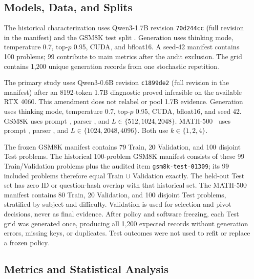 \documentclass[runningheads]{llncs}
\begin{document}
\subsection{Models, Data, and Splits}

The historical characterization uses Qwen3-1.7B revision
\texttt{70d244cc} (full revision in the manifest) and the GSM8K test split
\cite{cobbe2021gsm8k}. Generation uses thinking mode, temperature 0.7,
top-$p$ 0.95, CUDA, and bfloat16. A seed-42 manifest contains 100 problems; 99
contribute to main metrics after the audit exclusion. The grid contains 1,200
unique generation records from one stochastic repetition.

The primary study uses Qwen3-0.6B revision
\texttt{c1899de2} (full revision in the manifest) after an 8192-token 1.7B
diagnostic proved infeasible on the available RTX 4060. This amendment does
not relabel or pool 1.7B evidence. Generation uses thinking mode, temperature
0.7, top-$p$ 0.95, CUDA, bfloat16, and seed 42. GSM8K uses prompt
, parser , and
$L\in\{512,1024,2048\}$. MATH-500~\cite{hendrycks2021math} uses prompt
, parser , and
$L\in\{1024,2048,4096\}$. Both use $k\in\{1,2,4\}$.

The frozen GSM8K manifest contains 79 Train, 20 Validation, and 100 disjoint
Test problems. The historical 100-problem GSM8K manifest consists of these 99
Train/Validation problems plus the audited item \texttt{gsm8k-test-01309}; its
99 included problems therefore equal Train $\cup$ Validation exactly. The
held-out Test set has zero ID or question-hash overlap with that historical
set. The MATH-500 manifest contains 80 Train, 20 Validation, and 100 disjoint
Test problems, stratified by subject and difficulty. Validation is
used for selection and pivot decisions, never as final evidence. After policy
and software freezing, each Test grid was generated once, producing all 1,200
expected records without generation errors, missing keys, or duplicates. Test
outcomes were not used to refit or replace a frozen policy.

\subsection{Metrics and Statistical Analysis}
\end{document}
